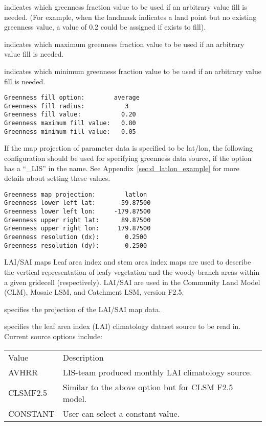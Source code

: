   indicates which greenness fraction 
 value to be used if an arbitrary value fill is needed. 
 (For example, when the landmask indicates a land point but no existing 
 greenness value, a value of 0.2 could be assigned if 
 exists to fill).

  indicates which maximum greenness
 fraction value to be used if an arbitrary value fill is needed. 

  indicates which minimum greenness
 fraction value to be used if an arbitrary value fill is needed. 
 

 \begin{Verbatim}[frame=single]
Greenness fill option:        average
Greenness fill radius:           3
Greenness fill value:           0.20
Greenness maximum fill value:   0.80
Greenness minimum fill value:   0.05
 \end{Verbatim}

 
 If the map projection of parameter data is specified to be lat/lon, 
 the following configuration should be used for specifying greenness
 data source, if the option has a ``\_LIS'' in the name.
 See Appendix~\ref{sec:d_latlon_example} for more details about
 setting these values.
 

 \begin{Verbatim}[frame=single]
Greenness map projection:        latlon
Greenness lower left lat:      -59.87500
Greenness lower left lon:     -179.87500
Greenness upper right lat:      89.87500
Greenness upper right lon:     179.87500
Greenness resolution (dx):       0.2500
Greenness resolution (dy):       0.2500
 \end{Verbatim}

 
 LAI/SAI maps
 Leaf area index and stem area index maps are used to describe the 
 vertical representation of leafy vegetation and the woody-branch
 areas within a given gridecell (respectively).  
 LAI/SAI are used in the Community Land Model (CLM), Mosaic LSM, and
 Catchment LSM, version F2.5.


  specifies the projection of the
 LAI/SAI map data.

  specifies the leaf area index (LAI)
 climatology dataset source to be read in. Current source options include:

 \begin{tabular}{ll}
 Value      & Description    \\
 AVHRR       &  LIS-team produced monthly LAI climatology source. \\
 CLSMF2.5    &  Similar to the above option but for CLSM F2.5 model. \\
 CONSTANT    &  User can select a constant value. \\
 \end{tabular}

